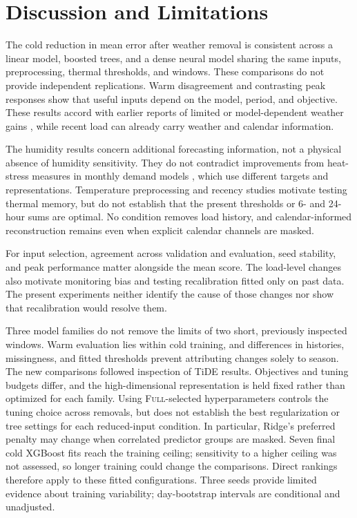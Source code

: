 \documentclass[conference]{IEEEtran}
\newcommand{\full}{\textsc{Full}}
\begin{document}
\section{Discussion and Limitations}
The cold reduction in mean error after weather removal is consistent across a linear model, boosted trees, and a dense neural model sharing the same inputs, preprocessing, thermal thresholds, and windows. These comparisons do not provide independent replications. Warm disagreement and contrasting peak responses show that useful inputs depend on the model, period, and objective. These results accord with earlier reports of limited or model-dependent weather gains \cite{haben2019,yang2024}, while recent load can already carry weather and calendar information.

The humidity results concern additional forecasting information, not a physical absence of humidity sensitivity. They do not contradict improvements from heat-stress measures in monthly demand models \cite{maia2020}, which use different targets and representations. Temperature preprocessing and recency studies \cite{candela2022,wang2016} motivate testing thermal memory, but do not establish that the present thresholds or 6- and 24-hour sums are optimal. No condition removes load history, and calendar-informed reconstruction remains even when explicit calendar channels are masked.

For input selection, agreement across validation and evaluation, seed stability, and peak performance matter alongside the mean score. The load-level changes also motivate monitoring bias and testing recalibration fitted only on past data. The present experiments neither identify the cause of those changes nor show that recalibration would resolve them.

Three model families do not remove the limits of two short, previously inspected windows. Warm evaluation lies within cold training, and differences in histories, missingness, and fitted thresholds prevent attributing changes solely to season. The new comparisons followed inspection of TiDE results. Objectives and tuning budgets differ, and the high-dimensional representation is held fixed rather than optimized for each family. Using \full-selected hyperparameters controls the tuning choice across removals, but does not establish the best regularization or tree settings for each reduced-input condition. In particular, Ridge's preferred penalty may change when correlated predictor groups are masked. Seven final cold XGBoost fits reach the training ceiling; sensitivity to a higher ceiling was not assessed, so longer training could change the comparisons. Direct rankings therefore apply to these fitted configurations. Three seeds provide limited evidence about training variability; day-bootstrap intervals are conditional and unadjusted.
\end{document}
